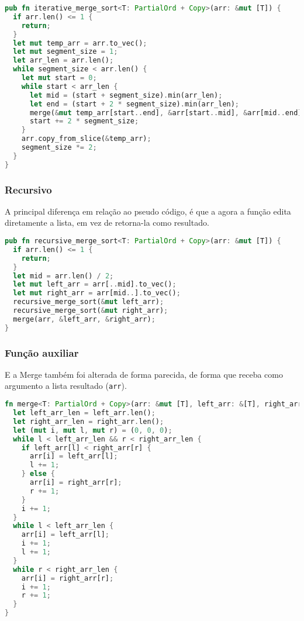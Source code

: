 \begin{lstlisting}[language=Rust]
pub fn iterative_merge_sort<T: PartialOrd + Copy>(arr: &mut [T]) {
  if arr.len() <= 1 {
    return;
  }
  let mut temp_arr = arr.to_vec();
  let mut segment_size = 1;
  let arr_len = arr.len();
  while segment_size < arr.len() {
    let mut start = 0;
    while start < arr_len {
      let mid = (start + segment_size).min(arr_len);
      let end = (start + 2 * segment_size).min(arr_len);
      merge(&mut temp_arr[start..end], &arr[start..mid], &arr[mid..end]);
      start += 2 * segment_size;
    }
    arr.copy_from_slice(&temp_arr);
    segment_size *= 2;
  }
}
\end{lstlisting}

\subsubsection{Recursivo}

A principal diferença em relação ao pseudo código, é que a agora a função edita diretamente a lista, em vez de retorna-la como resultado.

\begin{lstlisting}[language=Rust]
pub fn recursive_merge_sort<T: PartialOrd + Copy>(arr: &mut [T]) {
  if arr.len() <= 1 {
    return;
  }
  let mid = arr.len() / 2;
  let mut left_arr = arr[..mid].to_vec();
  let mut right_arr = arr[mid..].to_vec();
  recursive_merge_sort(&mut left_arr);
  recursive_merge_sort(&mut right_arr);
  merge(arr, &left_arr, &right_arr);
}
\end{lstlisting}
\FloatBarrier

\subsubsection{Função auxiliar}

E a Merge também foi alterada de forma parecida, de forma que receba como argumento a lista resultado (\texttt{arr}).

\begin{lstlisting}[language=Rust]
fn merge<T: PartialOrd + Copy>(arr: &mut [T], left_arr: &[T], right_arr: &[T]) {
  let left_arr_len = left_arr.len();
  let right_arr_len = right_arr.len();
  let (mut i, mut l, mut r) = (0, 0, 0);
  while l < left_arr_len && r < right_arr_len {
    if left_arr[l] < right_arr[r] {
      arr[i] = left_arr[l];
      l += 1;
    } else {
      arr[i] = right_arr[r];
      r += 1;
    }
    i += 1;
  }
  while l < left_arr_len {
    arr[i] = left_arr[l];
    i += 1;
    l += 1;
  }
  while r < right_arr_len {
    arr[i] = right_arr[r];
    i += 1;
    r += 1;
  }
}
\end{lstlisting}


